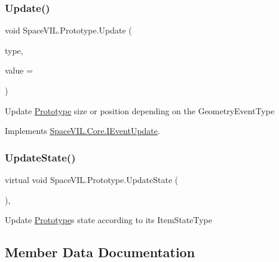\mbox{\label{class_space_v_i_l_1_1_prototype_a04c59a65bf5d4b493b925fd86c69b5ff}} 
\subsubsection{\texorpdfstring{Update()}{Update()}}
{\footnotesize\ttfamily void Space\+V\+I\+L.\+Prototype.\+Update (\begin{DoxyParamCaption}\item[{Geometry\+Event\+Type}]{type,  }\item[{int}]{value = {} }\end{DoxyParamCaption})}



Update \mbox{\hyperlink{class_space_v_i_l_1_1_prototype}{Prototype}} size or position depending on the Geometry\+Event\+Type 



Implements \mbox{\hyperlink{interface_space_v_i_l_1_1_core_1_1_i_event_update}{Space\+V\+I\+L.\+Core.\+I\+Event\+Update}}.

\mbox{\label{class_space_v_i_l_1_1_prototype_ae2a88a91dcf919d9d945d55996b2f896}} 
\subsubsection{\texorpdfstring{Update\+State()}{UpdateState()}}
{\footnotesize\ttfamily virtual void Space\+V\+I\+L.\+Prototype.\+Update\+State (\begin{DoxyParamCaption}{ }\end{DoxyParamCaption})\hspace{0.3cm}{\ttfamily [protected]}, {\ttfamily [virtual]}}



Update \mbox{\hyperlink{class_space_v_i_l_1_1_prototype}{Prototype}}\textquotesingle{}s state according to its Item\+State\+Type 



\subsection{Member Data Documentation}
\mbox{\label{class_space_v_i_l_1_1_prototype_af974f404a58d925f4db7b6c31bf8bbfc}} 
